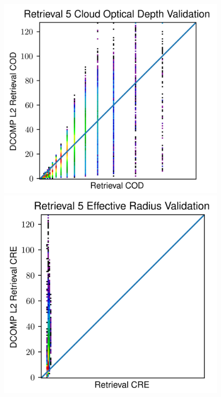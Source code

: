 \documentclass[12pt]{article}
\begin{document}
\begin{figure}[h!]
\begin{center}
{            \includegraphics[width=.32\paperwidth]{figs/val_ret5_cod.png}
            \includegraphics[width=.30\paperwidth]{figs/val_ret5_cre.png}
        }
        \makebox[\textwidth]{
}
\end{center}
\end{figure}
\end{document}
